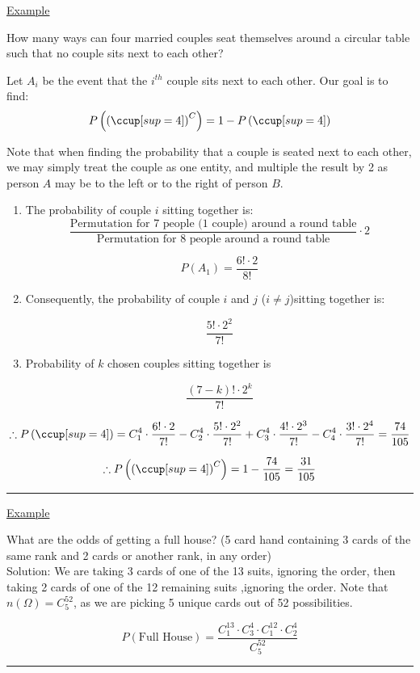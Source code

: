 \documentclass[12pt]{article}
\newcommand{\pp}[1]{\left(#1\right)}
\newcommand{\divider}[0]{\textcolor{lightgray}{\rule{\textwidth}{0.1pt}}}
\newenvironment{example}{\shownto{-,notes}\underline{Example}\par}{\par\divider\endshownto}
\begin{document}
\begin{example}
	How many ways can four married couples seat themselves around a circular table such that no couple sits next to each other?
	
	Let $A_i$ be the event that the $i^{th}$ couple sits next to each other. Our goal is to find:
	$$P\pp{\pp{\ccup[sup=4]}^C} = 1 - P\pp{\ccup[sup=4]}$$
	
	Note that when finding the probability that a couple is seated next to each other, we may simply treat the couple as one entity, and multiple the result by 2 as person $A$ may be to the left or to the right of person $B$.
	
	\begin{enumerate}
		\item The probability of couple $i$ sitting together is:
		$$\frac{\text{Permutation for 7 people (1 couple) around a round table}}{\text{Permutation for 8 people around a round table}} \cdot 2$$
		
		$$P(A_1) = \frac{6! \cdot 2}{8!}$$
		
		\item Consequently, the probability of couple $i$ and $j$ ($i \ne j$)sitting together is:
		
		$$\frac{5! \cdot 2^2}{7!}$$
		
		\item Probability of $k$ chosen couples sitting together is
		
		$$\frac{(7 - k)! \cdot 2^k}{7!}$$
	\end{enumerate}

	$$\therefore P\pp{\ccup[sup=4]} = C^4_1 \cdot \frac{6! \cdot 2}{7!} - C^4_2 \cdot \frac{5! \cdot 2^2}{7!} + C^4_3 \cdot \frac{4! \cdot 2^3}{7!} - C^4_4 \cdot \frac{3! \cdot 2^4}{7!} = \frac{74}{105}$$
	
	$$\therefore P\pp{\pp{\ccup[sup=4]}^C} = 1 - \frac{74}{105} = \frac{31}{105}$$
\end{example}

\begin{example}
	What are the odds of getting a full house? (5 card hand containing 3 cards of the same rank and 2 cards or another rank, in any order) \\
	
	Solution: We are taking 3 cards of one of the 13 suits, ignoring the order, then taking 2 cards of one of the 12 remaining suits ,ignoring the order. Note that $n(\Omega) = C^{52}_5$, as we are picking 5 unique cards out of 52 possibilities.
	
	$$P(\text{Full House}) = \frac{C^{13}_1 \cdot C^4_3 \cdot C^{12}_1 \cdot C^4_2}{C^{52}_5}$$
\end{example}
\end{document}
